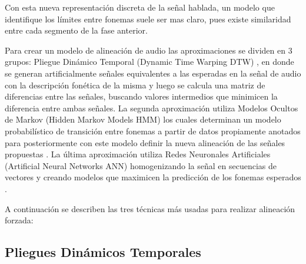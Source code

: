 Con esta nueva representación discreta de la señal hablada, un modelo que identifique los límites entre fonemas suele ser mas claro, pues existe similaridad entre cada segmento de la fase anterior.

Para crear un modelo de alineación de audio las aproximaciones se dividen en 3 grupos: Pliegue Dinámico Temporal (Dynamic Time Warping DTW)  \cite{Sakoe1978DynamicRecognition}, en donde se generan artificialmente señales equivalentes a las esperadas en la señal de audio con la descripción fonética de la misma y luego se calcula una matriz de diferencias entre las señales, buscando valores intermedios que minimicen la diferencia entre ambas señales. La segunda aproximación utiliza Modelos Ocultos de Markov (Hidden Markov Models HMM) los cuales determinan un modelo probabilístico de transición entre fonemas a partir de datos propiamente anotados para posteriormente con este modelo definir la nueva alineación de las señales propuestas \cite{RabinerARecognition}. La última aproximación utiliza Redes Neuronales Artificiales (Artificial Neural Networks ANN) homogenizando la señal en secuencias de vectores y creando modelos que maximicen la predicción de los fonemas esperados  \cite{Deng2012}.

A continuación se describen las tres técnicas más usadas para realizar alineación forzada:

\subsection{Pliegues Dinámicos Temporales}


